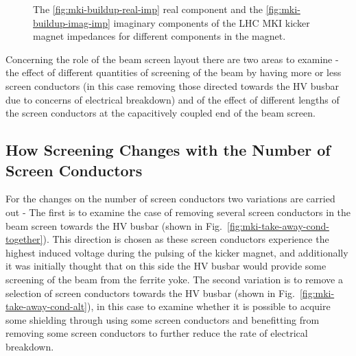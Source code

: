 \begin{figure}
\caption{The \ref{fig:mki-buildup-real-imp} real component and the \ref{fig:mki-buildup-imag-imp} imaginary components of the LHC MKI kicker magnet impedances for different components in the magnet.}
\label{fig:mki-buildup-impedance}
\end{figure}


Concerning the role of the beam screen layout there are two areas to examine - the effect of different quantities of screening of the beam by having more or less screen conductors (in this case removing those directed towards the HV busbar due to concerns of electrical breakdown) and of the effect of different lengths of the screen conductors at the capacitively coupled end of the beam screen.

\subsection{How Screening Changes with the Number of Screen Conductors}

For the changes on the number of screen conductors two variations are carried out - The first is to examine the case of removing several screen conductors in the beam screen towards the HV busbar (shown in Fig.~\ref{fig:mki-take-away-cond-together}). This direction is chosen as these screen conductors experience the highest induced voltage during the pulsing of the kicker magnet, and additionally it was initially thought that on this side the HV busbar would provide some screening of the beam from the ferrite yoke. The second variation is to remove a selection of screen conductors towards the HV busbar (shown in Fig.~\ref{fig:mki-take-away-cond-alt}), in this case to examine whether it is possible to acquire some shielding through using some screen conductors and benefitting from removing some screen conductors to further reduce the rate of electrical breakdown.

